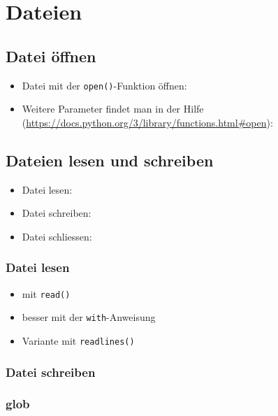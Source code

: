 \section{Dateien}

\subsection{Datei öffnen}
\begin{itemize}
	\item Datei mit der \texttt{open()}-Funktion öffnen:
	
	\item Weitere Parameter findet man in der Hilfe (\url{https://docs.python.org/3/library/functions.html#open}):
	
\end{itemize}

\subsection{Dateien lesen und schreiben}
\begin{itemize}
	\item Datei lesen:
	
	\item Datei schreiben:
	
	\item Datei schliessen:
	
\end{itemize}

\subsubsection{Datei lesen}
\begin{itemize}
	\item mit \texttt{read()}
	
	\item besser mit der \texttt{with}-Anweisung
	
	\item Variante mit \texttt{readlines()}
	
\end{itemize}

\subsubsection{Datei schreiben}


\subsubsection{glob}


